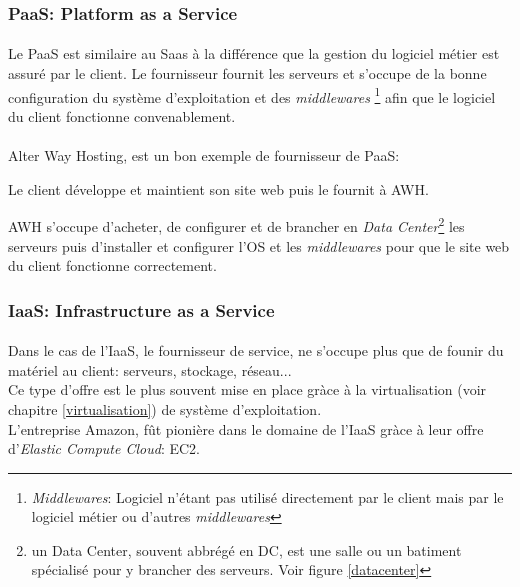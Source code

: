 \subsubsection{PaaS: Platform as a Service}
\paragraph*{}
Le PaaS est similaire au Saas à la différence que la gestion du logiciel métier est assuré par le client.
Le fournisseur fournit les serveurs et s'occupe de la bonne configuration du système d'exploitation et des \emph{middlewares}
\footnote{\emph{Middlewares}: Logiciel n'étant pas utilisé directement par le client mais par le logiciel métier ou d'autres \emph{middlewares}} afin
que le logiciel du client fonctionne convenablement.

\paragraph*{}
Alter Way Hosting, est un bon exemple de fournisseur de PaaS: \\
\begin{listi}
\item 	Le client développe et maintient son site web puis le fournit à AWH.\\
\item 	AWH s'occupe d'acheter, de configurer et de brancher en \emph{Data Center}\footnote{un Data Center, souvent abbrégé en DC, est une salle
		ou un batiment spécialisé pour y brancher des serveurs. Voir figure \ref{datacenter}} les serveurs puis d'installer et configurer l'OS et les \emph{middlewares} pour que
		le site web du client fonctionne correctement.
\end{listi}

\subsubsection{IaaS: Infrastructure as a Service}
\paragraph*{}
Dans le cas de l'IaaS, le fournisseur de service, ne s'occupe plus que de founir du matériel au client: serveurs, stockage, réseau...
\\
Ce type d'offre est le plus souvent mise en place gràce à la virtualisation (voir chapitre \ref{virtualisation}) de système d'exploitation.
\\
L'entreprise Amazon, fût pionière dans le domaine de l'IaaS gràce à leur offre d'\textsl{Elastic Compute Cloud}: EC2.

